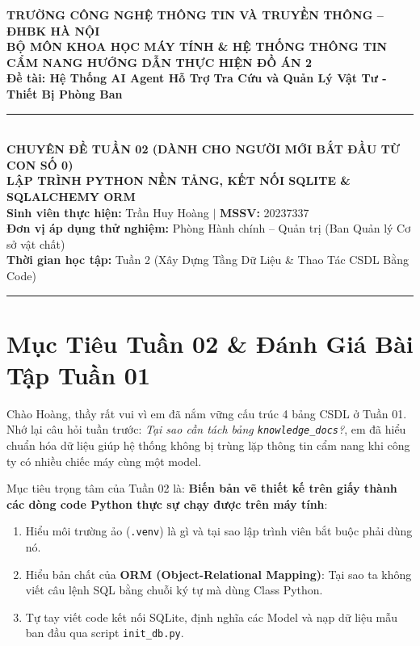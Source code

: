 \documentclass[11pt,a4paper]{article}
\begin{document}
\begin{center}
    {\large \textbf{TRƯỜNG CÔNG NGHỆ THÔNG TIN VÀ TRUYỀN THÔNG -- ĐHBK HÀ NỘI}}\\[0.2em]
    {\normalsize \textbf{BỘ MÔN KHOA HỌC MÁY TÍNH \& HỆ THỐNG THÔNG TIN}}\\[1.0em]
    
    {\Large \bfseries \color{blue!85!black} CẨM NANG HƯỚNG DẪN THỰC HIỆN ĐỒ ÁN 2}\\[0.3em]
    {\large \textbf{Đề tài: Hệ Thống AI Agent Hỗ Trợ Tra Cứu và Quản Lý Vật Tư - Thiết Bị Phòng Ban}}\\[0.8em]
    
    \rule{0.85\textwidth}{0.8pt}\\[0.6em]
    
    {\bfseries CHUYÊN ĐỀ TUẦN 02 (DÀNH CHO NGƯỜI MỚI BẮT ĐẦU TỪ CON SỐ 0)}\\[0.3em]
    {\large \bfseries LẬP TRÌNH PYTHON NỀN TẢNG, KẾT NỐI SQLITE \& SQLALCHEMY ORM}\\[0.8em]
    
    \small
    \textbf{Sinh viên thực hiện:} Trần Huy Hoàng \quad $\vert$ \quad \textbf{MSSV:} 20237337\\
    \textbf{Đơn vị áp dụng thử nghiệm:} Phòng Hành chính -- Quản trị (Ban Quản lý Cơ sở vật chất)\\
    \textbf{Thời gian học tập:} Tuần 2 (Xây Dựng Tầng Dữ Liệu \& Thao Tác CSDL Bằng Code)
\end{center}

\vspace{0.2cm}
\hrule
\vspace{0.3cm}

\section{Mục Tiêu Tuần 02 \& Đánh Giá Bài Tập Tuần 01}

Chào Hoàng, thầy rất vui vì em đã nắm vững cấu trúc 4 bảng CSDL ở Tuần 01. Nhớ lại câu hỏi tuần trước: \textit{Tại sao cần tách bảng \texttt{knowledge\_docs}?}, em đã hiểu chuẩn hóa dữ liệu giúp hệ thống không bị trùng lặp thông tin cẩm nang khi công ty có nhiều chiếc máy cùng một model.

Mục tiêu trọng tâm của Tuần 02 là: \textbf{Biến bản vẽ thiết kế trên giấy thành các dòng code Python thực sự chạy được trên máy tính}:
\begin{enumerate}
    \item Hiểu môi trường ảo (\texttt{.venv}) là gì và tại sao lập trình viên bắt buộc phải dùng nó.
    \item Hiểu bản chất của \textbf{ORM (Object-Relational Mapping)}: Tại sao ta không viết câu lệnh SQL bằng chuỗi ký tự mà dùng Class Python.
    \item Tự tay viết code kết nối SQLite, định nghĩa các Model và nạp dữ liệu mẫu ban đầu qua script \texttt{init\_db.py}.
\end{enumerate}
\end{document}
